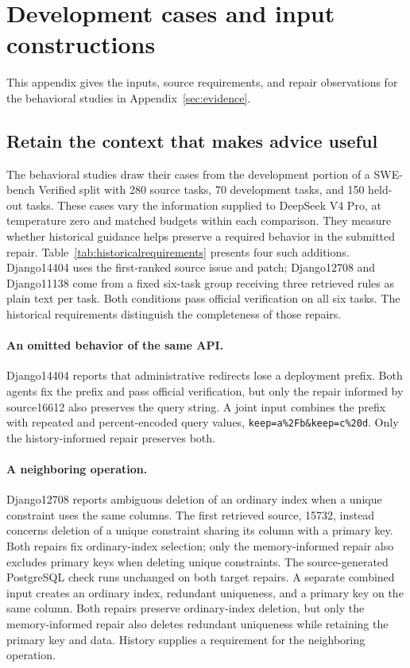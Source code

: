 \section{Development cases and input constructions}
\label{sec:development-details}
This appendix gives the inputs, source requirements, and repair observations
for the behavioral studies in Appendix~\ref{sec:evidence}.
\subsection{Retain the context that makes advice useful}
\label{sec:details-evidence}
\label{sec:details-content}
The behavioral studies draw their cases from the development portion of a
SWE-bench Verified split with 280 source tasks, 70 development tasks, and
150 held-out tasks. These cases vary the information supplied to DeepSeek
V4 Pro, at temperature zero and matched budgets within each comparison.
They measure whether historical guidance helps preserve a required
behavior in the submitted repair.
Table~\ref{tab:historicalrequirements} presents four such additions.
Django14404 uses the first-ranked source issue and patch; Django12708 and
Django11138 come from a fixed six-task group receiving three retrieved rules
as plain text per task. Both conditions pass official verification on all six tasks.
The historical requirements distinguish the completeness of those repairs.

\paragraph{An omitted behavior of the same API.}
Django14404 reports that administrative redirects lose a deployment prefix.
Both agents fix the prefix and pass official verification, but only the repair informed by source16612 also preserves the query string.
A joint input combines the prefix with repeated and percent-encoded query values, \texttt{keep=a\%2Fb}\allowbreak\texttt{\&keep=c\%20d}.
Only the history-informed repair preserves both.

\paragraph{A neighboring operation.}
Django12708 reports ambiguous deletion of an ordinary index when a unique constraint uses the same columns.
The first retrieved source, 15732, instead concerns deletion of a unique constraint sharing its column with a primary key.
Both repairs fix ordinary-index selection; only the memory-informed repair also excludes primary keys when deleting unique constraints.
The source-generated PostgreSQL check runs unchanged on both target repairs.
A separate combined input creates an ordinary index, redundant uniqueness, and a primary key on the same column.
Both repairs preserve ordinary-index deletion, but only the memory-informed repair also deletes redundant uniqueness while retaining the primary key and data.
History supplies a requirement for the neighboring operation.

